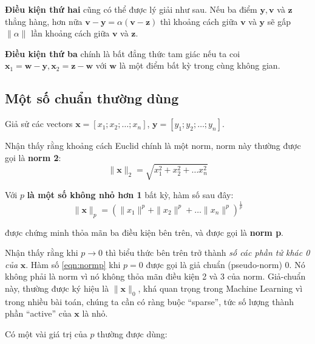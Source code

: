\documentclass[12pt]{article}
\begin{document}
\textbf{Điều kiện thứ hai} cũng có thể được lý giải như sau. Nếu ba điểm $\mathbf{y, v}$ và $\mathbf{z}$ thẳng hàng, hơn nữa $\mathbf{v - y} = \alpha (\mathbf{v - z}) $ thì khoảng cách giữa $\mathbf{v}$ và $\mathbf{y}$ sẽ gấp $ \|\alpha \|$ lần khoảng cách giữa $\mathbf{v}$ và $\mathbf{z}$. 
 
\textbf{Điều kiện thứ ba} chính là bất đẳng thức tam giác nếu ta coi $\mathbf{x}_1 = \mathbf{ w - y}, \mathbf{x}_2 = \mathbf{z - w} $ với $\mathbf{w}$ là một điểm bất kỳ trong cùng không gian. 
 
 
 
\subsection{Một số chuẩn thường dùng}
 
Giả sử các vectors $\mathbf{x} = [x_1; x_2; \dots; x_n]$, $\mathbf{y} = [y_1; y_2; \dots; y_n]$. 
 
Nhận thấy rằng khoảng cách Euclid chính là một norm, norm này thường được gọi là \textbf{norm 2}: 
\begin{equation} 
	\label{eqn:norm2}
	\|\mathbf{x}\|_2 = \sqrt{x_1^2 + x_2^2 + \dots x_n^2} 
\end{equation}
 
Với $p$ \textbf{là một số không nhỏ hơn 1} bất kỳ, hàm số sau đây: 
\begin{equation} 
	\label{eqn:normp}
	\|\mathbf{x}\|_p = (\|x_1\|^p + \|x_2\|^p + \dots \|x_n\|^p)^{\frac{1}{p}} 
\end{equation} 
 
được chứng minh thỏa mãn ba điều kiện bên trên, và được gọi là \textbf{norm p}.  
     	
 
Nhận thấy rằng khi $p \rightarrow 0 $ thì biểu thức bên trên trở thành \textit{số các phần tử khác 0 của} $\mathbf{x}$. Hàm số \eqref{eqn:normp} khi $p = 0$ được gọi là giả chuẩn (pseudo-norm) 0. Nó không phải là norm vì nó không thỏa mãn điều kiện 2 và 3 của norm. Giả-chuẩn này, thường được ký hiệu là $\|\mathbf{x}\|_0$, khá quan trọng trong Machine Learning vì trong nhiều bài toán, chúng ta cần có ràng buộc “sparse”, tức số lượng thành phần “active” của $\mathbf{x}$ là nhỏ.  
 
Có một vài giá trị của $p$ thường được dùng: 
\end{document}
